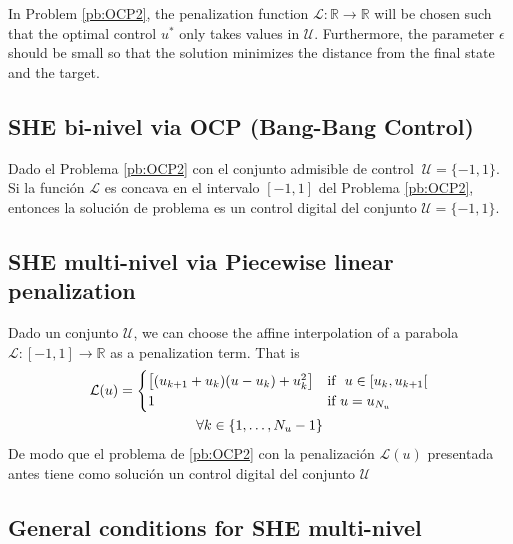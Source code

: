 In Problem \ref{pb:OCP2}, the penalization function $\mathcal L: \mathbb{R} \rightarrow \mathbb{R}$ will be chosen such that the optimal control $u^*$ only takes values in $\mathcal U$. Furthermore, the parameter $\epsilon$ should be small so that the solution minimizes the distance from the final state and the target.



\subsection{SHE bi-nivel via OCP (Bang-Bang Control)}

\begin{theorem}\label{th:bang-bang}
    Dado el Problema \ref{pb:OCP2} con el conjunto admisible de control $ \ \mathcal{U} = \{-1,1\}$. Si la función $\mathcal{L}$ es concava en el intervalo $[-1,1]$ del Problema \ref{pb:OCP2}, entonces la solución de problema es un control digital del conjunto $\mathcal{U} =  \{-1,1\}$.
\end{theorem}


\subsection{SHE multi-nivel via Piecewise linear penalization}

\begin{theorem}
    Dado un conjunto $\mathcal{U}$, we can choose the affine interpolation of a parabola $\mathcal{L}:[-1,1] \rightarrow \mathbb{R}$ as a penalization term. That is
    \begin{gather}\label{PLP}
        \mathcal{L}(u) = \begin{cases}
            \big[ (u_{k+1}+u_{k}) (u-u_k) + u_k^2 \big] & \text{if }  u \in [u_k,u_{k+1}[ \\
            1 & \text{if } u = u_{N_u} 
        \end{cases} \\
        \notag \forall k \in \{1,\dots,N_u-1\}
    \end{gather}
    De modo que el problema de \ref{pb:OCP2} con la penalización $\mathcal{L}(u)$ presentada antes tiene como solución un control digital del conjunto $\mathcal{U}$
\end{theorem}
\subsection{General conditions for  SHE multi-nivel}   

